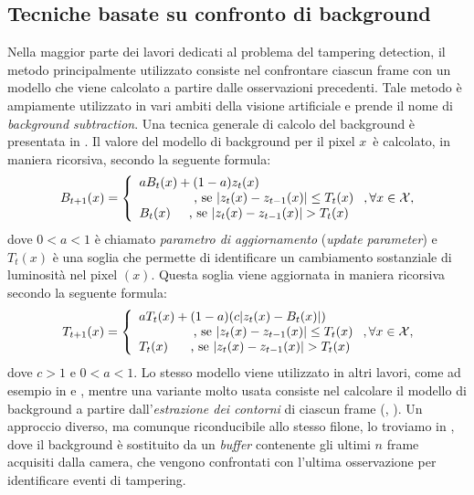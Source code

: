 \subsection{Tecniche basate su confronto di background}
\label{background}
Nella maggior parte dei lavori dedicati al problema del tampering detection, il metodo principalmente utilizzato consiste nel confrontare ciascun frame con un modello che viene calcolato a partire dalle osservazioni precedenti.
Tale metodo \`e ampiamente utilizzato in vari ambiti della visione artificiale e prende il nome di \textit{background subtraction}.
Una tecnica generale di calcolo del background \`e presentata in \cite{aksay2007camera}.
Il valore del modello di background per il pixel $x$\ \`e calcolato, in maniera ricorsiva, secondo la seguente formula:
\[
\label{eq:background}
B_{t + 1}(x)=\left\{ \begin{array} {lcl}
aB_t(x)+ (1-a)z_t(x) \\
\mbox{\hspace{1.5cm}, se } |z_t(x) - z_{t-1}(x)|\leq T_t(x) \\
B_t(x) \mbox{\hspace{0.5cm}, se } |z_t(x) - z_{t-1}(x)|>T_t(x)\end{array} \right. , \forall x \in \mathcal{X},
\]
dove $0 < a < 1$ \`e chiamato \textit{parametro di aggiornamento} (\textit{update parameter}) e $T_t(x)$ \`e una soglia che permette di identificare un cambiamento sostanziale di luminosit\`a nel pixel $(x)$. 
 Questa soglia viene aggiornata in maniera ricorsiva secondo la seguente formula:
  \[
  \label{eq:backgroundThreshUpd}
  T_{t + 1}(x)=\left\{ \begin{array} {lcl}
  aT_t(x)+ (1-a)(c |z_t(x) - B_t(x)|) \\
  \mbox{\hspace{1.5cm}, se	}  |z_t(x) - z_{t-1}(x)|\leq T_t(x) \\
  T_t(x) \mbox{	\hspace{0.5cm}, se	}  |z_t(x) - z_{t-1}(x)|>T_t(x) \end{array} \right. ,\forall x \in \mathcal{X},
  \]
  dove $c > 1$ e $0<a<1$.
  Lo stesso modello viene utilizzato in altri lavori, come ad esempio in \cite{saglam2009real} e \cite{tsesmelis2013tamper}, mentre una variante molto usata consiste nel calcolare il modello di background a partire dall'\textit{estrazione dei contorni} di ciascun frame (\cite{harasse2004automated}, \cite{gil2007automatic}).
  Un approccio diverso, ma comunque riconducibile allo stesso filone, lo troviamo in \cite{ribnick2006real}, dove il background \`e sostituito da un \textit{buffer} contenente gli ultimi $n$ frame acquisiti dalla camera, che vengono confrontati con l'ultima osservazione per identificare eventi di tampering.
